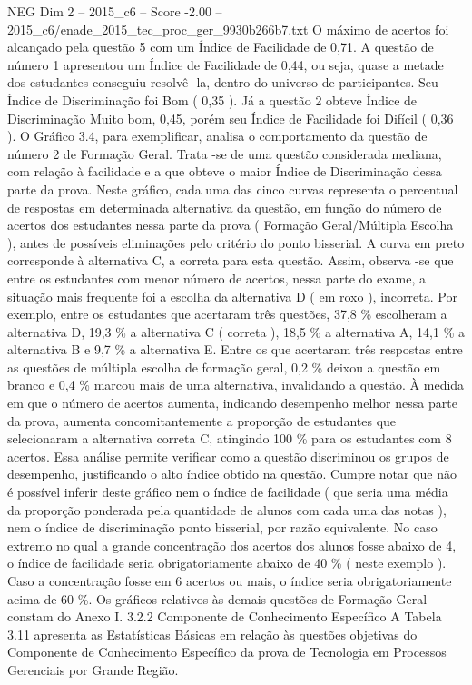 \begin{textsample}{NEG Dim 2 – 2015\_c6 – Score -2.00 – 2015\_c6/enade\_2015\_tec\_proc\_ger\_9930b266b7.txt}
O máximo de acertos foi alcançado pela questão 5 com um Índice de Facilidade de 0,71.
A questão de número 1 apresentou um Índice de Facilidade de 0,44, ou seja, quase a metade dos estudantes conseguiu resolvê -la, dentro do universo de participantes.
Seu Índice de Discriminação foi Bom ( 0,35 ).
Já a questão 2 obteve Índice de Discriminação Muito bom, 0,45, porém seu Índice de Facilidade foi Difícil ( 0,36 ).
O Gráfico 3.4, para exemplificar, analisa o comportamento da questão de número 2 de Formação Geral.
Trata -se de uma questão considerada mediana, com relação à facilidade e a que obteve o maior Índice de Discriminação dessa parte da prova.
Neste gráfico, cada uma das cinco curvas representa o percentual de respostas em determinada alternativa da questão, em função do número de acertos dos estudantes nessa parte da prova ( Formação Geral/Múltipla Escolha ), antes de possíveis eliminações pelo critério do ponto bisserial.
A curva em preto corresponde à alternativa C, a correta para esta questão.
Assim, observa -se que entre os estudantes com menor número de acertos, nessa parte do exame, a situação mais frequente foi a escolha da alternativa D ( em roxo ), incorreta.
Por exemplo, entre os estudantes que acertaram três questões, 37,8 \% escolheram a alternativa D, 19,3 \% a alternativa C ( correta ), 18,5 \% a alternativa A, 14,1 \% a alternativa B e 9,7 \% a alternativa E.
Entre os que acertaram três respostas entre as questões de múltipla escolha de formação geral, 0,2 \% deixou a questão em branco e 0,4 \% marcou mais de uma alternativa, invalidando a questão.
À medida em que o número de acertos aumenta, indicando desempenho melhor nessa parte da prova, aumenta concomitantemente a proporção de estudantes que selecionaram a alternativa correta C, atingindo 100 \% para os estudantes com 8 acertos.
Essa análise permite verificar como a questão discriminou os grupos de desempenho, justificando o alto índice obtido na questão.
Cumpre notar que não é possível inferir deste gráfico nem o índice de facilidade ( que seria uma média da proporção ponderada pela quantidade de alunos com cada uma das notas ), nem o índice de discriminação ponto bisserial, por razão equivalente.
No caso extremo no qual a grande concentração dos acertos dos alunos fosse abaixo de 4, o índice de facilidade seria obrigatoriamente abaixo de 40 \% ( neste exemplo ).
Caso a concentração fosse em 6 acertos ou mais, o índice seria obrigatoriamente acima de 60 \%.
Os gráficos relativos às demais questões de Formação Geral constam do Anexo I. 3.2.2 Componente de Conhecimento Específico A Tabela 3.11 apresenta as Estatísticas Básicas em relação às questões objetivas do Componente de Conhecimento Específico da prova de Tecnologia em Processos Gerenciais por Grande Região.

\end{textsample}
